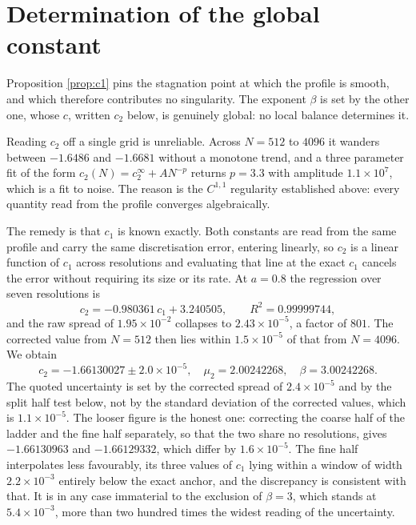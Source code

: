 \documentclass[11pt]{article}
\theoremstyle{definition}
\begin{document}
\section{Determination of the global constant}
\label{sec:control}

Proposition \ref{prop:c1} pins the stagnation point at which the profile is
smooth, and which therefore contributes no singularity. The exponent $\beta$ is
set by the other one, whose $c$, written $c_2$ below, is genuinely global: no
local balance determines it.

Reading $c_2$ off a single grid is unreliable. Across $N=512$ to $4096$ it
wanders between $-1.6486$ and $-1.6681$ without a monotone trend, and a three
parameter fit of the form $c_2(N) = c_2^\infty + AN^{-p}$ returns $p=3.3$ with
amplitude $1.1\times10^7$, which is a fit to noise. The reason is the $C^{1,1}$
regularity established above: every quantity read from the profile converges
algebraically.

The remedy is that $c_1$ is known exactly. Both constants are read from the
same profile and carry the same discretisation error, entering linearly, so
$c_2$ is a linear function of $c_1$ across resolutions and evaluating that line
at the exact $c_1$ cancels the error without requiring its size or its rate. At
$a=0.8$ the regression over seven resolutions is
\begin{equation}
  c_2 = -0.980361\,c_1 + 3.240505, \qquad R^2 = 0.99999744,
\end{equation}
and the raw spread of $1.95\times10^{-2}$ collapses to $2.43\times10^{-5}$, a
factor of $801$. The corrected value from $N=512$ then lies within
$1.5\times10^{-5}$ of that from $N=4096$. We obtain
\begin{equation}
  c_2 = -1.66130027 \pm 2.0\times10^{-5}, \quad
  \mu_2 = 2.00242268, \quad
  \beta = 3.00242268.
\end{equation}
The quoted uncertainty is set by the corrected spread of $2.4\times10^{-5}$ and
by the split half test below, not by the standard deviation of the corrected
values, which is $1.1\times10^{-5}$. The looser figure is the honest one:
correcting the coarse half of the ladder and the fine half separately, so that
the two share no resolutions, gives $-1.66130963$ and $-1.66129332$, which
differ by $1.6\times10^{-5}$. The fine half interpolates less favourably, its
three values of $c_1$ lying within a window of width $2.2\times10^{-3}$ entirely
below the exact anchor, and the discrepancy is consistent with that. It is in
any case immaterial to the exclusion of $\beta=3$, which stands at $5.4\times
10^{-3}$, more than two hundred times the widest reading of the uncertainty.
\end{document}

